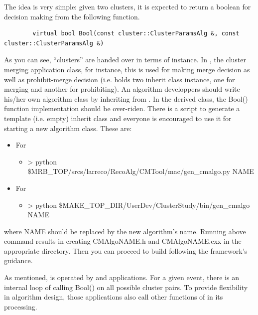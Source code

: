 The idea is very simple: given two clusters, it is expected to return a boolean for decision making from the following function.
\begin{lstlisting}
        virtual bool Bool(const cluster::ClusterParamsAlg &, const cluster::ClusterParamsAlg &)
\end{lstlisting}
As you can see, ``clusters'' are handed over in terms of {\cpan} instance.
In {\cmerge}, the cluster merging application class, for instance, this is used for making merge decision as well as prohibit-merge decision (i.e. {\cmerge} holds two {\cbalgo} inherit class instance, one for merging and another for prohibiting).
An algorithm developpers should write his/her own {\CPP} algorithm class by inheriting from {\cbalgo}.
In the derived class, the {\ttfamily Bool()} function implementation should be over-riden. 
There is a script to generate a template (i.e. empty) {\cbalgo} inherit class and everyone is encouraged to use it for starting a new algorithm class. These are:
\begin{itemize}
\item For {\larsoft}
\begin{itemize}
        \item[]{\ttfamily> python \$MRB\_TOP/srcs/larreco/RecoAlg/CMTool/mac/gen\_cmalgo.py NAME}
\end{itemize}
\item For {\larlight}
\begin{itemize}
        \item[]{\ttfamily> python \$MAKE\_TOP\_DIR/UserDev/ClusterStudy/bin/gen\_cmalgo NAME}
\end{itemize}
\end{itemize}
where {\ttfamily NAME} should be replaced by the new algorithm's name. 
Running above command results in creating {\ttfamily CMAlgoNAME.h} and {\ttfamily CMAlgoNAME.cxx} in the appropriate directory.
Then you can proceed to build following the framework's guidance.

As mentioned, {\cbalgo} is operated by {\cmerge} and {\cmatch} applications.
For a given event, there is an internal loop of calling {\ttfamily Bool()} on all possible cluster pairs.
To provide flexibility in algorithm design, those applications also call other functions of {\cbalgo} in its processing.

